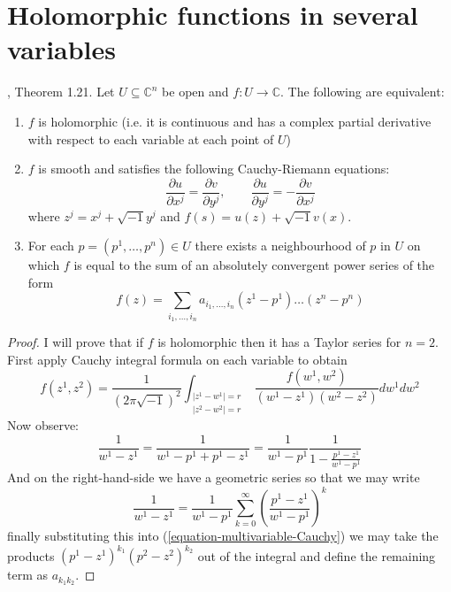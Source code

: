 \section{Holomorphic functions in several variables}
\label{section-holomorphic-functions-in-several-variables}

\begin{lemma}
\label{lemma-holomorphic-function-characterization}
\cite{lec}, Theorem 1.21. Let $U\subseteq\mathbb{C}^n$ be open and $f:U\to
\mathbb{C}$. The following are equivalent:
\begin{enumerate}
\item $f$ is holomorphic (i.e. it is continuous and has a complex partial
derivative with respect to each variable at each point of $U$)
\item $f$ is smooth and satisfies the following Cauchy-Riemann equations:
\begin{equation}
\label{equation-Cauchy-Riemann-several-variables}
\frac{\partial u}{\partial x^j}=\frac{\partial v}{\partial y^j},\qquad 
\frac{\partial u}{\partial y^j}=-\frac{\partial v}{\partial x^j}
\end{equation}
where $z^j=x^j+\sqrt{-1}y^j$ and $f(s)=u(z)+\sqrt{-1}v(x)$.
\item For each $p=(p^1,\ldots,p^n)\in U$ there exists a neighbourhood of $p$ in
$U$ on which $f$ is equal to the sum of an absolutely convergent power series of
the form
\begin{equation}
\label{equation-Taylor-series-several-variables}
f(z)=\sum_{i_1,\ldots,i_n}a_{i_1,\ldots,i_n}(z^1-p^1)\ldots(z^n-p^n)
\end{equation}
\end{enumerate}
\end{lemma}

\begin{proof}
I will prove that if $f$ is holomorphic then it has a Taylor series for $n=2$. 
First apply Cauchy integral formula on each variable to obtain
$$
f(z^1,z^2)=\frac{1}{(2\pi\sqrt{-1})^2}
\int_{\substack{|z^1-w^1|=r \\ |z^2-w^2|=r}}
\frac{f(w^1,w^2)}{(w^1-z^1)(w^2-z^2)}dw^1dw^2
$$
Now observe:
\begin{equation}
\label{equation-multivariable-Cauchy}
\frac{1}{w^1-z^1}=\frac{1}{w^1-p^1+p^1-z^1}
=\frac{1}{w^1-p^1}\frac{1}{1-\frac{p^1-z^1}{w^1-p^1}}
\end{equation}
And on the right-hand-side we have a geometric series so that we may write
$$
\frac{1}{w^1-z^1}
=\frac{1}{w^1-p^1}\sum_{k=0}^\infty\left(\frac{p^1-z^1}{w^1-p^1}\right)^k
$$
finally substituting this into (\ref{equation-multivariable-Cauchy}) we may take
the products $(p^1-z^1)^{k_1}(p^2-z^2)^{k_2}$ out of the integral and define the
remaining term as $a_{k_1k_2}$.
\end{proof}

